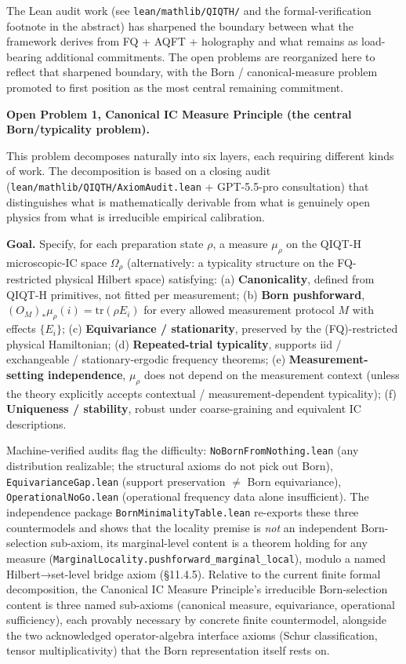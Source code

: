 \documentclass[11pt,a4paper]{article}
\begin{document}
The Lean audit work (see \texttt{lean/mathlib/QIQTH/} and the formal-verification footnote in the abstract) has sharpened the boundary between what the framework derives from FQ + AQFT + holography and what remains as load-bearing additional commitments. The open problems are reorganized here to reflect that sharpened boundary, with the Born / canonical-measure problem promoted to first position as the most central remaining commitment.

\textbf{Open Problem 1, Canonical IC Measure Principle (the central Born/typicality problem).}

This problem decomposes naturally into six layers, each requiring different kinds of work. The decomposition is based on a closing audit (\texttt{lean/mathlib/QIQTH/AxiomAudit.lean} + GPT-5.5-pro consultation) that distinguishes what is mathematically derivable from what is genuinely open physics from what is irreducible empirical calibration.

\textbf{Goal.} Specify, for each preparation state $\rho$, a measure $\mu_\rho$ on the QIQT-H microscopic-IC space $\Omega_\rho$ (alternatively: a typicality structure on the FQ-restricted physical Hilbert space) satisfying:
   (a) \textbf{Canonicality}, defined from QIQT-H primitives, not fitted per measurement;
   (b) \textbf{Born pushforward}, $(O_M)_* \mu_\rho(i) = \mathrm{tr}(\rho E_i)$ for every allowed measurement protocol $M$ with effects $\{E_i\}$;
   (c) \textbf{Equivariance / stationarity}, preserved by the (FQ)-restricted physical Hamiltonian;
   (d) \textbf{Repeated-trial typicality}, supports iid / exchangeable / stationary-ergodic frequency theorems;
   (e) \textbf{Measurement-setting independence}, $\mu_\rho$ does not depend on the measurement context (unless the theory explicitly accepts contextual / measurement-dependent typicality);
   (f) \textbf{Uniqueness / stability}, robust under coarse-graining and equivalent IC descriptions.

Machine-verified audits flag the difficulty: \texttt{NoBornFromNothing.lean} (any distribution realizable; the structural axioms do not pick out Born), \texttt{EquivarianceGap.lean} (support preservation $\neq$ Born equivariance), \texttt{OperationalNoGo.lean} (operational frequency data alone insufficient). The independence package \texttt{BornMinimalityTable.lean} re-exports these three countermodels and shows that the locality premise is \emph{not} an independent Born-selection sub-axiom, its marginal-level content is a theorem holding for any measure (\texttt{MarginalLocality.pushforward\_marginal\_local}), modulo a named Hilbert→set-level bridge axiom (§11.4.5). Relative to the current finite formal decomposition, the Canonical IC Measure Principle's irreducible Born-selection content is three named sub-axioms (canonical measure, equivariance, operational sufficiency), each provably necessary by concrete finite countermodel, alongside the two acknowledged operator-algebra interface axioms (Schur classification, tensor multiplicativity) that the Born representation itself rests on.
\end{document}
